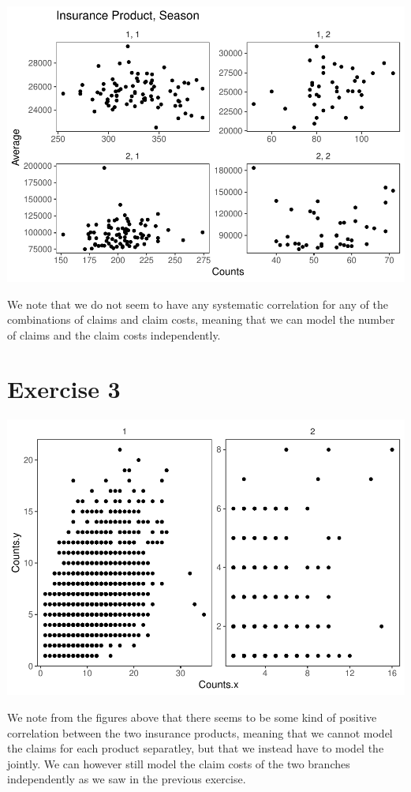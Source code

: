 \documentclass[]{article}
\begin{document}
\includegraphics{Projekt1_files/figure-latex/unnamed-chunk-8-1.pdf}

We note that we do not seem to have any systematic correlation for any
of the combinations of claims and claim costs, meaning that we can model
the number of claims and the claim costs independently.

\section{Exercise 3}\label{exercise-3}

\includegraphics{Projekt1_files/figure-latex/unnamed-chunk-9-1.pdf}

We note from the figures above that there seems to be some kind of
positive correlation between the two insurance products, meaning that we
cannot model the claims for each product separatley, but that we instead
have to model the jointly. We can however still model the claim costs of
the two branches independently as we saw in the previous exercise.
\end{document}
